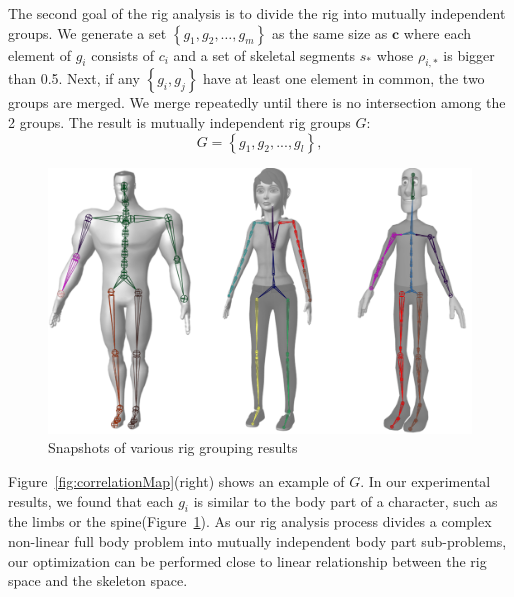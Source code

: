 The second goal of the rig analysis is to divide the rig into mutually independent groups.
We generate a set $\left\{g_1, g_2, \dots, g_m\right\}$ as the same size as $\mathbf{c}$ where each element of $g_i$ consists of $c_i$ and a set of skeletal segments $s_*$ whose $\rho_{i,*}$ is bigger than 0.5. Next, if any $\left\{g_i, g_j\right\}$ have at least one element in common, the two groups are merged. We merge repeatedly until there is no intersection among the 2 groups. The result is mutually independent rig groups $G$:
\begin{equation}
	G = \left \{ {g_{1}, g_{2}, ..., g_{l}} \right \},
\end{equation}
\begin{figure}[ht]
  \centering
  \includegraphics[width=0.85\linewidth]{images/bodyPartGrouping}
  \caption{Snapshots of various rig  grouping results}
  \label{fig:rigGroupingResult}
\end{figure}
Figure~\ref{fig:correlationMap}(right) shows an example of $G$. In our experimental results, we found that each $g_i$ is similar to the body part of a character, such as the limbs or the spine(Figure~\ref{fig:rigGroupingResult}). As our rig analysis process divides a complex non-linear full body problem into mutually independent body part sub-problems, our optimization can be performed close to linear relationship between the rig space and the skeleton space. 

